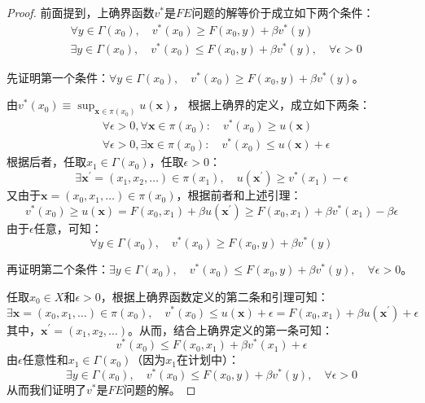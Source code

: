 \begin{proof}
    前面提到，上确界函数$v^*$是$FE$问题的解等价于成立如下两个条件：
    $$
    \begin{aligned}
        &\forall y \in \Gamma\left(x_0\right),\quad v^*\left(x_0\right)\geq F\left(x_0,y\right) + \beta v^*\left(y\right)\\
        &\exists y\in \Gamma\left(x_0\right),\quad v^*\left(x_0\right)\leq F\left(x_0,y\right) + \beta v^*\left(y\right), \quad \forall \epsilon > 0
    \end{aligned}
    $$
    
    先证明第一个条件：$\forall y \in \Gamma\left(x_0\right),\quad v^*\left(x_0\right)\geq F\left(x_0,y\right) + \beta v^*\left(y\right)$。

    由$v^*\left(x_0\right)\equiv \sup _{\boldsymbol{x}\in\pi\left(x_0\right)} u\left(\boldsymbol{x}\right)$，
    根据上确界的定义，成立如下两条：
    \begin{equation*}
        \begin{aligned}
            &\forall \epsilon > 0, \forall \boldsymbol{x}\in \pi\left(x_0\right): \quad v^*\left(x_0\right)\geq u\left(\boldsymbol{x}\right) \\
            &\forall \epsilon > 0, \exists \boldsymbol{x}\in\pi\left(x_0\right): \quad v^*\left(x_0\right)\leq u\left(\boldsymbol{x}\right)+\epsilon
        \end{aligned}
    \end{equation*}
    根据后者，任取$x_1 \in \Gamma\left(x_0\right)$，任取$\epsilon > 0$：
    $$\exists \boldsymbol{x}^{\prime}=\left(x_1,x_2,\dots\right) \in \pi\left(x_1\right), 
        \quad u\left(\boldsymbol{x}^{\prime}\right)\geq v^*\left(x_1\right)-\epsilon$$
    又由于$\boldsymbol{x}=\left(x_0,x_1,\dots\right)\in \pi\left(x_0\right)$，根据前者和上述引理：
    $$
    v^*\left(x_0\right)\geq u\left(\boldsymbol{x}\right)=F\left(x_0,x_1\right)+\beta u\left(\boldsymbol{x}^{\prime}\right)
        \geq F\left(x_0,x_1\right)+\beta v^*\left(x_1\right)-\beta \epsilon
    $$
    由于$\epsilon$任意，可知：
    $$
    \forall y \in \Gamma\left(x_0\right),\quad v^*\left(x_0\right)\geq F\left(x_0,y\right) + \beta v^*\left(y\right)
    $$

    再证明第二个条件：$\exists y\in \Gamma\left(x_0\right),\quad v^*\left(x_0\right)\leq F\left(x_0,y\right) + \beta v^*\left(y\right), \quad \forall \epsilon > 0$。

    任取$x_0\in X$和$\epsilon>0$，根据上确界函数定义的第二条和引理可知：
    $$
    \exists \boldsymbol{x}=\left(x_0,x_1,\dots\right)\in \pi\left(x_0\right), 
        \quad v^*\left(x_0\right)\leq u\left(\boldsymbol{x}\right)+\epsilon = F\left(x_0,x_1\right)+\beta u\left(\boldsymbol{x}^{\prime}\right)+\epsilon
    $$
    其中，$\boldsymbol{x}^{\prime}= \left(x_1,x_2,\dots\right)$。从而，结合上确界定义的第一条可知：
    $$
    v^*\left(x_0\right)\leq F\left(x_0,x_1\right)+\beta v^*\left(x_1\right)+\epsilon 
    $$
    由$\epsilon$任意性和$x_1\in\Gamma\left(x_0\right)$（因为$x_1$在计划中）：
    $$
    \exists y\in \Gamma\left(x_0\right),\quad v^*\left(x_0\right)\leq F\left(x_0,y\right) + \beta v^*\left(y\right), \quad \forall \epsilon > 0
    $$
    从而我们证明了$v^*$是$FE$问题的解。
\end{proof}

